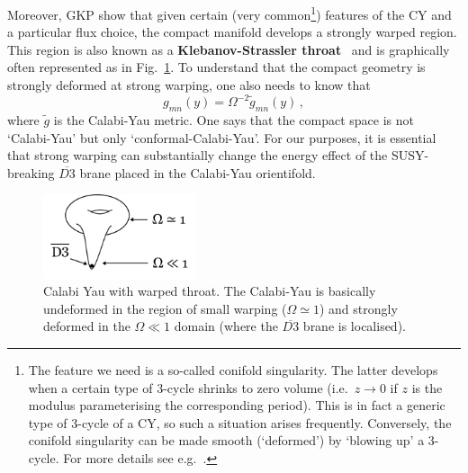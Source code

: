 \documentclass[12pt]{article}
\newcommand{\be}{\begin{equation}}
\newcommand{\ee}{\end{equation}}
\numberwithin{equation}{section}
\begin{document}
Moreover, GKP show that given certain (very common\footnote{
The 
feature we need is a so-called conifold singularity. The latter develops when a certain type of 3-cycle shrinks to zero volume (i.e.~$z\to 0$ if $z$ is the modulus parameterising the corresponding period). This is in fact a generic type of 3-cycle of a CY, so such a situation arises frequently. Conversely, the conifold singularity can be made smooth (`deformed') by `blowing up' a 3-cycle. For more details see e.g.~\cite{Candelas:1989js}.
}) 
features of the CY and a particular flux choice, the compact manifold develops a  strongly warped region. This region is also known as a {\bf Klebanov-Strassler throat}~\cite{Klebanov:2000hb} and is graphically often represented as in Fig.~\ref{cy+throat}. To understand that the compact geometry is strongly deformed at strong warping, one also needs to know that~\cite{Klebanov:2000hb, Giddings:2001yu}
\be
g_{mn}(y)=\Omega^{-2}\tilde{g}_{mn}(y)\,,
\ee
where $\tilde{g}$ is the Calabi-Yau metric. One says that the compact space is not `Calabi-Yau' but only `conformal-Calabi-Yau'. For our purposes, it is essential that strong warping can substantially change the energy effect of the SUSY-breaking $\overline{D3}$ brane placed in the Calabi-Yau orientifold. 

\begin{figure}[ht]
\begin{center} 
\includegraphics[width=4.5cm]{cy+throat.png}
\caption{Calabi Yau with warped throat. The Calabi-Yau is basically undeformed in the region of small warping ($\Omega\simeq 1$) and strongly deformed in the $\Omega\ll 1$ domain (where the $\overline{D3}$ brane is localised).
}
\label{cy+throat} 
\end{center}
\end{figure}
\end{document}

